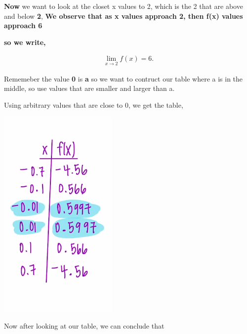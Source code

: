 \documentclass{report}
\begin{document}
    \textbf{Now} we want to look at the closet x values to 2, 
    which is the 2 that are above and below \textbf{2}, \textbf{We observe that as x values approach
    2, then f(x) values approach 6}

    \bigbreak \noindent 
    \textbf{so we write,}    

    \begin{large}
        \begin{align*}
            \lim\limits_{x \to 2}{f \left(x\right) = 6}
        .\end{align*}
    \end{large}
    
    \bigbreak \noindent 
    
    \bigbreak \noindent 
    Rememeber the value \textbf{0} is \textbf{a} so we want to contruct our table where a 
    is in the middle, so use values that are smaller and larger than a.

    \bigbreak \noindent 
    Using arbitrary values that are close to 0, we get the table, 

    \bigbreak \noindent 
    \begin{center}
        \includegraphics[scale=0.5]{../images/table2.png}
    \end{center}
    
    \bigbreak \noindent 
    Now after looking at our table, we can conclude that

    \bigbreak \noindent 
\end{document}
